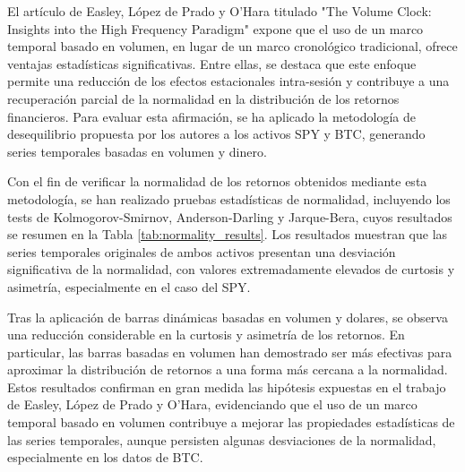 \documentclass[a4paper,12pt, twoside]{report}
\begin{document}
El artículo de Easley, López de Prado y O'Hara titulado "The Volume Clock: Insights into the High Frequency 
Paradigm" \cite{easley2012volume} expone que el uso de un marco temporal basado en volumen, en lugar de un 
marco cronológico tradicional, ofrece ventajas estadísticas significativas. Entre ellas, se destaca que 
este enfoque permite una reducción de los efectos estacionales intra-sesión y contribuye a una recuperación 
parcial de la normalidad en la distribución de los retornos financieros. Para evaluar esta afirmación, se 
ha aplicado la metodología de desequilibrio propuesta por los autores a los activos SPY y BTC, generando 
series temporales basadas en volumen y dinero.

Con el fin de verificar la normalidad de los retornos obtenidos mediante esta metodología, se han realizado 
pruebas estadísticas de normalidad, incluyendo los tests de Kolmogorov-Smirnov, Anderson-Darling y Jarque-Bera, 
cuyos resultados se resumen en la Tabla \ref{tab:normality_results}. Los resultados muestran que las series 
temporales originales de ambos activos presentan una desviación significativa de la normalidad, con valores 
extremadamente elevados de curtosis y asimetría, especialmente en el caso del SPY. 

Tras la aplicación de barras dinámicas basadas en volumen y dolares, se observa una reducción considerable 
en la curtosis y asimetría de los retornos. En particular, las barras basadas en volumen han demostrado 
ser más efectivas para aproximar la distribución de retornos a una forma más cercana a la normalidad. 
Estos resultados confirman en gran medida las hipótesis expuestas en el trabajo de Easley, López de Prado y O'Hara, 
evidenciando que el uso de un marco temporal basado en volumen contribuye a mejorar las propiedades 
estadísticas de las series temporales, aunque persisten algunas desviaciones de la normalidad, 
especialmente en los datos de BTC.
\end{document}
